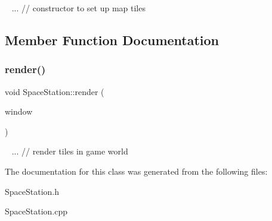~\newline
... // constructor to set up map tiles

\subsection{Member Function Documentation}
\mbox{\label{class_space_station_a824f72a1cc84e640f8db8be290227cbe}} 
\subsubsection{\texorpdfstring{render()}{render()}}
{\footnotesize\ttfamily void Space\+Station\+::render (\begin{DoxyParamCaption}\item[{sf\+::\+Render\+Window \&}]{window }\end{DoxyParamCaption})}

~\newline
... // render tiles in game world

The documentation for this class was generated from the following files\+:\begin{DoxyCompactItemize}
\item 
Space\+Station.\+h\item 
Space\+Station.\+cpp\end{DoxyCompactItemize}
